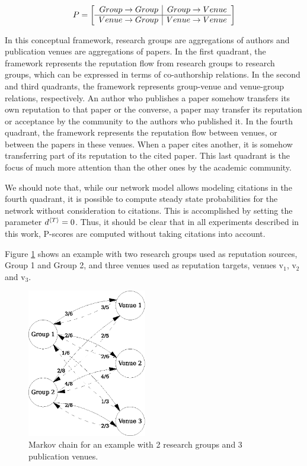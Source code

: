 \documentclass[notitlepage]{svjour3}
\begin{document}
\begin{align}\label{eq:newp}
P =
\left[
\begin{array}{r | r}
Group \rightarrow Group & Group \rightarrow Venue \\
\hline
Venue \rightarrow Group & Venue \rightarrow Venue \\
\end{array}
\right]
\end{align}

In this conceptual framework, research groups are 
aggregations of authors and publication venues are aggregations of papers.
In the first quadrant, the framework represents the reputation
flow from research groups to research groups, which can be expressed in
terms of co-authorship relations. In the second and 
third quadrants, the framework
represents group-venue and venue-group relations,
respectively. An author who publishes a paper somehow
transfers its own reputation to that paper or the converse,
a paper may transfer its reputation or acceptance by the
community to the authors who published it. In the fourth
quadrant, the framework represents the reputation flow between
venues, or between the papers in these venues. When a paper cites 
another, it is somehow
transferring part of its reputation to the cited paper. This
last quadrant is the focus of much more attention than the
other ones by the academic community. 

We should note that, while our network model allows modeling citations in the fourth quadrant, it is possible to compute 
steady state probabilities for the network without consideration to citations. This is accomplished by setting the parameter 
$d{^{\langle T \rangle}} = 0$. 
Thus, it should be clear that in all experiments described in this work, P-scores 
are computed without taking citations into account. 

Figure \ref{fig:ex1-MC} shows an example with two research groups used as reputation sources, Group 1 and Group 2, and three venues used as reputation targets, venues $\mbox{v}_1$, $\mbox{v}_2$ and $\mbox{v}_3$.
%
\begin{figure}[ht]
   \centerline{\includegraphics[width=5.2cm]{figures/models/bhrscore-w3}}
   \caption{Markov chain for an example with 2 research groups and 3 publication venues.}
   \label{fig:ex1-MC}
\end{figure}
\end{document}
